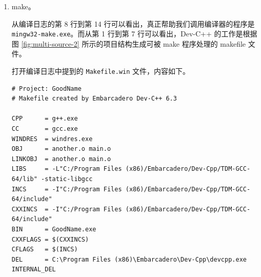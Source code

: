 \begin{enumerate}
	为什么不只在 \lstinline[language={}]{another.h} 中实现 \lstinline[language={[17]C++}, moreemph={[2]another}]{another} 函数，而要把声明和实现分离在两个文件中？在本例中，这似乎是可行的，进行文本替换后唯一的源文件 \lstinline[language={}]{main.cpp} 将变为：

	\begin{lstlisting}[language={[17]C++}, moreemph={[2]another, strlen}]
// main.cpp
#include <iostream>
#include <cstring>

long long another(const char* str)
{
	return std::strlen(str);
}

int main()
{
	long long ago { another("figure emerged") };
	std::cout << ago << std::endl;
}
	\end{lstlisting}

	问题实际上就在于文本替换。如果存在另一个源文件 \lstinline[language={}]{yet_another.cpp}，它也通过 \lstinline[language={[17]C++}]{#include} 指令包含了 \lstinline[language={}]{another.h}，则文本替换后，\lstinline[language={[17]C++}, moreemph={[2]another}]{another} 函数将存在两个实现：这是链接器不允许的。

	综上，声明与实现分离的原因是避免展开 \lstinline[language={[17]C++}]{#include} 指令后在多个源文件中出现重复的函数实现\footnote{可以使用 \lstinline[language={[17]C++}]{inline} 关键字告诉编译器这个函数可以因为多次 \lstinline[language={[17]C++}]{#include} 重复定义。尽管如此，一般仍然会分离函数的声明和实现，以避免展开 \lstinline[language={[17]C++}]{#include} 指令产生大量实现代码，从而提升编译速度。相关知识属于 C++ 语法范畴，此处不予详细讨论。}。

	\item make。

	从编译日志的第 8 行到第 14 行可以看出，真正帮助我们调用编译器的程序是 \lstinline[language={}]{mingw32-make.exe}。而从第 1 行到第 7 行可以看出，Dev-C++ 的工作是根据图 \ref{fig:multi-source-2} 所示的项目结构生成可被 make 程序处理的 makefile 文件。

	打开编译日志中提到的 \lstinline[language={}]{Makefile.win} 文件，内容如下。

	\begin{lstlisting}[language={[gnu]make}]
# Project: GoodName
# Makefile created by Embarcadero Dev-C++ 6.3

CPP      = g++.exe
CC       = gcc.exe
WINDRES  = windres.exe
OBJ      = another.o main.o
LINKOBJ  = another.o main.o
LIBS     = -L"C:/Program Files (x86)/Embarcadero/Dev-Cpp/TDM-GCC-64/lib" -static-libgcc
INCS     = -I"C:/Program Files (x86)/Embarcadero/Dev-Cpp/TDM-GCC-64/include"
CXXINCS  = -I"C:/Program Files (x86)/Embarcadero/Dev-Cpp/TDM-GCC-64/include"
BIN      = GoodName.exe
CXXFLAGS = $(CXXINCS)
CFLAGS   = $(INCS)
DEL      = C:\Program Files (x86)\Embarcadero\Dev-Cpp\devcpp.exe INTERNAL_DEL


\end{lstlisting}
\end{enumerate}
